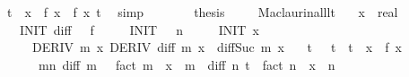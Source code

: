 \begin{isabellebody}
\ {\isachardoublequoteopen}{\isasymbar}t{\isasymbar}\ {\isasymle}\ {\isasymbar}x{\isasymbar}\ {\isasymand}\ f\ x\ {\isacharequal}{\kern0pt}\ {\isacharquery}{\kern0pt}f\ x\ t{\isachardoublequoteclose}\ \isamarkupfalse%
\ simp\isanewline
\ \ \ \ \isamarkupfalse%
\ \isamarkupfalse%
\ {\isacharquery}{\kern0pt}thesis\ \isacommand{{\isachardot}{\kern0pt}{\isachardot}{\kern0pt}}\isamarkupfalse%
\isanewline
\ \ \isamarkupfalse%
\isanewline
{}\isamarkupfalse%
%
\endisatagproof
{\isafoldproof}%
%
\isadelimproof
\isanewline
%
\endisadelimproof
\isanewline
{}\isamarkupfalse%
\ Maclaurin{\isacharunderscore}{\kern0pt}all{\isacharunderscore}{\kern0pt}lt{\isacharcolon}{\kern0pt}\isanewline
\ \ \ x\ {\isacharcolon}{\kern0pt}{\isacharcolon}{\kern0pt}\ real\isanewline
\ \ \ INIT{}{\isacharcolon}{\kern0pt}\ {\isachardoublequoteopen}diff\ {}\ {\isacharequal}{\kern0pt}\ f{\isachardoublequoteclose}\isanewline
\ \ \ \ \ INIT{}{\isacharcolon}{\kern0pt}\ {\isachardoublequoteopen}{}\ {\isacharless}{\kern0pt}\ n{\isachardoublequoteclose}\isanewline
\ \ \ \ \ INIT{}{\isacharcolon}{\kern0pt}\ {\isachardoublequoteopen}x\ {\isasymnoteq}\ {}{\isachardoublequoteclose}\isanewline
\ \ \ \ \ DERIV{\isacharcolon}{\kern0pt}\ {\isachardoublequoteopen}{\isasymforall}m\ x{\isachardot}{\kern0pt}\ DERIV\ {\isacharparenleft}{\kern0pt}diff\ m{\isacharparenright}{\kern0pt}\ x\ {\isacharcolon}{\kern0pt}{\isachargreater}{\kern0pt}\ diff{\isacharparenleft}{\kern0pt}Suc\ m{\isacharparenright}{\kern0pt}\ x{\isachardoublequoteclose}\isanewline
\ \ \ {\isachardoublequoteopen}{\isasymexists}t{\isachardot}{\kern0pt}\ {}\ {\isacharless}{\kern0pt}\ {\isasymbar}t{\isasymbar}\ {\isasymand}\ {\isasymbar}t{\isasymbar}\ {\isacharless}{\kern0pt}\ {\isasymbar}x{\isasymbar}\ {\isasymand}\ f\ x\ {\isacharequal}{\kern0pt}\isanewline
\ \ \ \ \ \ {\isacharparenleft}{\kern0pt}{\isasymSum}m{\isacharless}{\kern0pt}n{\isachardot}{\kern0pt}\ {\isacharparenleft}{\kern0pt}diff\ m\ {}\ {\isacharslash}{\kern0pt}\ fact\ m{\isacharparenright}{\kern0pt}\ {\isacharasterisk}{\kern0pt}\ x\ {\isacharcircum}{\kern0pt}\ m{\isacharparenright}{\kern0pt}\ {\isacharplus}{\kern0pt}\ {\isacharparenleft}{\kern0pt}diff\ n\ t\ {\isacharslash}{\kern0pt}\ fact\ n{\isacharparenright}{\kern0pt}\ {\isacharasterisk}{\kern0pt}\ x\ {\isacharcircum}{\kern0pt}\ n{\isachardoublequoteclose}\isanewline

\end{isabellebody}
